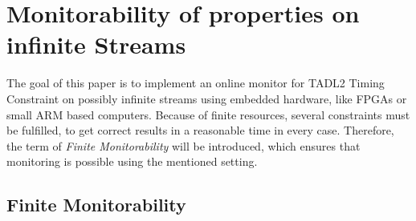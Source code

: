 
\chapter{Monitorability of properties on infinite Streams}
\label{chapter-monitorability}
	The goal of this paper is to implement an online monitor for TADL2 Timing Constraint on possibly infinite streams using embedded hardware, like FPGAs or small ARM based computers. Because of finite resources, several constraints must be fulfilled, to get correct results in a reasonable time in every case. Therefore, the term of \emph{Finite Monitorability} will be introduced, which ensures that monitoring is possible using the mentioned setting.

\section{Finite Monitorability}
